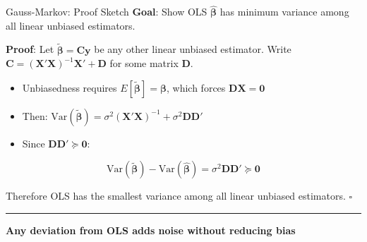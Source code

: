 \documentclass[8pt,aspectratio=169]{beamer}
\newcommand{\bottomnote}[1]{%
\vfill
\vspace{-2mm}
\textcolor{mllavender2}{\rule{\textwidth}{0.4pt}}
\vspace{1mm}
\footnotesize
\textbf{#1}
}
\begin{document}
\begin{frame}[t]{Gauss-Markov: Proof Sketch}
  \textbf{Goal}: Show OLS $\hat{\boldsymbol{\beta}}$ has minimum variance among all linear unbiased estimators.

  \textbf{Proof}: Let $\tilde{\boldsymbol{\beta}} = \mathbf{Cy}$ be any other linear unbiased estimator. Write $\mathbf{C} = (\mathbf{X}'\mathbf{X})^{-1}\mathbf{X}' + \mathbf{D}$ for some matrix $\mathbf{D}$.

  \begin{itemize}
    \item Unbiasedness requires $E[\tilde{\boldsymbol{\beta}}] = \boldsymbol{\beta}$, which forces $\mathbf{DX} = \mathbf{0}$
    \item Then: $\text{Var}(\tilde{\boldsymbol{\beta}}) = \sigma^2(\mathbf{X}'\mathbf{X})^{-1} + \sigma^2\mathbf{DD}'$
    \item Since $\mathbf{DD}' \succeq \mathbf{0}$:
  \end{itemize}

  \begin{equation}
    \text{Var}(\tilde{\boldsymbol{\beta}}) - \text{Var}(\hat{\boldsymbol{\beta}}) = \sigma^2 \mathbf{DD}' \succeq \mathbf{0}
  \end{equation}

  Therefore OLS has the smallest variance among all linear unbiased estimators. $\square$

  \bottomnote{Any deviation from OLS adds noise without reducing bias}
\end{frame}
\end{document}
